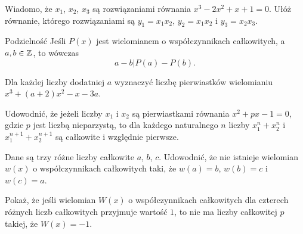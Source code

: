 \documentclass{article}
\begin{document}

%

\begin{zadanie}
  Wiadomo, że $x_1$, $x_2$, $x_3$ są rozwiązaniami równania $x^3-2x^2+x+1=0$. Ułóż równanie, którego rozwiązaniami są $y_1=x_1x_2$, $y_2=x_1x_2$ i $y_3=x_2x_3$.
\end{zadanie}

\begin{mybox}{Podzielność}
  Jeśli $P(x)$ jest wielomianem o współczynnikach całkowitych, a $a,b\in\mathbb{Z}$, to wówczas
  $$a-b|P(a)-P(b).$$
\end{mybox}


\begin{zadanie}
  Dla każdej liczby dodatniej $a$ wyznaczyć liczbę pierwiastków wielomianiu $x^3+(a+2)x^2-x-3a$.
\end{zadanie}

\begin{zadanie}
  Udowodnić, że jeżeli liczby $x_1$ i $x_2$ są pierwiastkami równania $x^2+px-1=0$, gdzie $p$ jest liczbą nieparzystą, to dla każdego naturalnego $n$ liczby $x_1^n+x_2^n$ i $x_1^{n+1}+x_2^{n+1}$ są całkowite i względnie pierwsze.
\end{zadanie}

\begin{zadanie}
  Dane są trzy różne liczby całkowite $a$, $b$, $c$. Udowodnić, że nie istnieje wielomian $w(x)$ o współczynnikach całkowitych taki, że $w(a)=b$, $w(b)=c$ i $w(c)=a$.
\end{zadanie}

\begin{zadanie}
  Pokaż, że jeśli wielomian $W(x)$ o współczynnikach całkowitych dla czterech różnych liczb całkowitych przyjmuje wartość $1$, to nie ma liczby całkowitej $p$ takiej, że $W(x)=-1$.
\end{zadanie}
\end{document}
